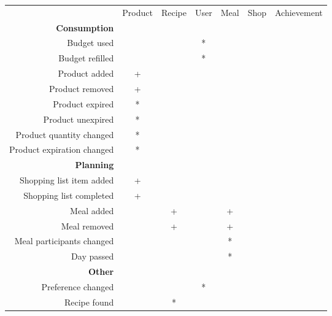 \begin{table}[h]
\begin{tabular}{r c c c c c c}
                          \vline           & Product& Recipe & User & Meal & Shop & Achievement\\
 \textbf{Consumption}     \vline           &        &        &      &      &      &            \\   
 \hline    
 Budget used    		  \vline           &        &        &   *  &      &      &            \\
 Budget refilled		  \vline	       &        &        &   *  &      &      &            \\
 Product added	 		  \vline    	   &     +  &        &      &      &      &            \\
 Product removed		  \vline    	   &     +  &        &      &      &      &            \\
 Product expired		  \vline	       &     *  &        &      &      &      &            \\
 Product unexpired		  \vline	       &     *  &        &      &      &      &            \\
 Product quantity changed \vline	       &     *  &        &      &      &      &            \\
 Product expiration changed\vline	       &     *  &        &      &      &      &            \\
 \hline				
 \textbf{Planning}   	  \vline           &        &        &      &      &      &            \\
 \hline 
 Shopping list item added \vline    	   &     +  &        &      &      &      &            \\
 Shopping list completed  \vline	       &     +  &        &      &      &      &            \\
 Meal added			  	  \vline	       &        &      + &      &    + &      &            \\
 Meal removed             \vline	       &        &      + &      &    + &      &            \\
 Meal participants changed\vline	       &        &        &      &    * &      &            \\
 Day passed				  \vline	       &        &        &      &    * &      &            \\
 \hline           
 \textbf{Other}           \vline           &        &        &      &      &      &            \\ 
 \hline        
 Preference changed       \vline	       &        &        &   *  &      &      &            \\
 Recipe found              \vline          &        &      * &      &      &      &            
\end{tabular}
\end{table}